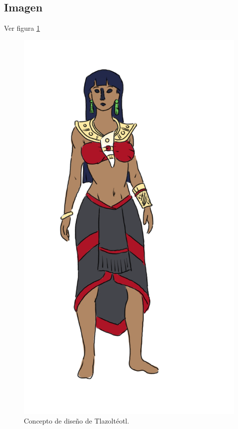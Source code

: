 \subsection{Imagen}
Ver figura \ref{fig:TlazolteotlDiseno}
	\begin{figure}
					\centering
					\includegraphics[height=0.3 \textheight]{Imagenes/diosaLujuria}
					\caption{Concepto de diseño de Tlazoltéotl.}
					\label{fig:TlazolteotlDiseno}
	\end{figure}
